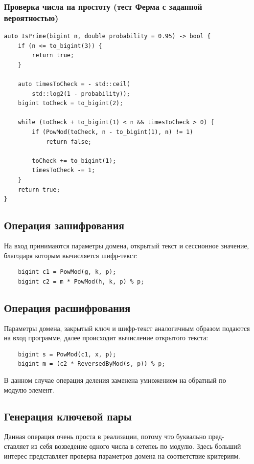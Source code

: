 \documentclass[a4paper]{article}
\begin{document}
  \subsubsection{Проверка числа на простоту (тест Ферма с заданной вероятностью)}

  \begin{verbatim}
auto IsPrime(bigint n, double probability = 0.95) -> bool {
    if (n <= to_bigint(3)) {
        return true;
    }

    auto timesToCheck = - std::ceil(
        std::log2(1 - probability));
    bigint toCheck = to_bigint(2);

    while (toCheck + to_bigint(1) < n && timesToCheck > 0) {
        if (PowMod(toCheck, n - to_bigint(1), n) != 1) 
            return false;

        toCheck += to_bigint(1);
        timesToCheck -= 1;
    }
    return true;
}
  \end{verbatim}

  \subsection{Операция зашифрования}

  На вход принимаются параметры домена, открытый текст и сессионное значение,
  благодаря которым вычисляется шифр-текст:
  \begin{verbatim}
    bigint c1 = PowMod(g, k, p);
    bigint c2 = m * PowMod(h, k, p) % p;
  \end{verbatim}

  \subsection{Операция расшифрования}

  Параметры домена, закрытый ключ и шифр-текст аналогичным образом подаются на вход
  программе, далее происходит вычисление открытого текста:
  \begin{verbatim}
    bigint s = PowMod(c1, x, p);
    bigint m = (c2 * ReversedByMod(s, p)) % p;
  \end{verbatim}

  В данном случае операция деления заменена умножением на обратный по модулю элемент.

  \subsection{Генерация ключевой пары}

  Данная операция очень проста в реализации, потому что буквально пред-\\ставляет
  из себя возведение одного числа в сетепеь по модулю. Здесь больший интерес представляет
  проверка параметров домена на соответствие критериям.
\end{document}
